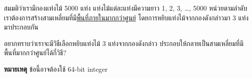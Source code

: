 \question{}

สมมติว่าเรามีกองแท่งไม้ 5000 แท่ง แท่งไม้แต่ละแท่งมีความยาว 1, 2, 3, \ldots, 5000 หน่วยตามลำดับ\;
เราต้องการสร้างสามเหลี่ยมที่มี\uline{พื้นที่ภายในมากกว่าศูนย์}\hrsp%
โดยการหยิบแท่งไม้จากกองดังกล่าวมา 3 แท่งมาประกอบกัน

อยากทราบว่าเราจะมีวิธีเลือกหยิบแท่งไม้ 3 แท่งจากกองดังกล่าว
ประกอบให้กลายเป็นสามเหลี่ยมที่มีพื้นที่มากกว่าศูนย์ได้กี่วิธี?

\textbf{หมายเหตุ}\; ข้อนี้อาจต้องใช้ 64-bit integer

